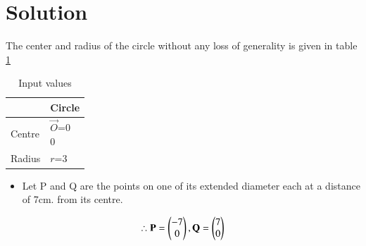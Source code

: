 \documentclass[journal,12pt,twocolumn]{IEEEtran}
\begin{document}
\section{Solution}
The center and radius of the circle without any loss of generality is given in table \ref{tab:table1}
\begin{table}[!ht]
\begin{center}
\begin{tabular}{ | m{2cm} | m{2cm} |} 
\hline
 & Circle \\
\hline
Centre  & $\vec{O}$=\myvec{0\\0} \\ 
\hline
Radius & $r$=3  \\ 
\hline
\end{tabular}
\end{center}
\caption{Input values}
\label{tab:table1}
\end{table}
\begin{itemize}
 \item  Let P and Q are the points on one of its extended diameter each at a distance of 7cm. from its centre.
\end{itemize}
\begin{align}
 \therefore \mathbf{P} = \begin{pmatrix}-7\\0\end{pmatrix},\mathbf{Q} = \begin{pmatrix}7\\0\end{pmatrix}
\end{align}
\end{document}
